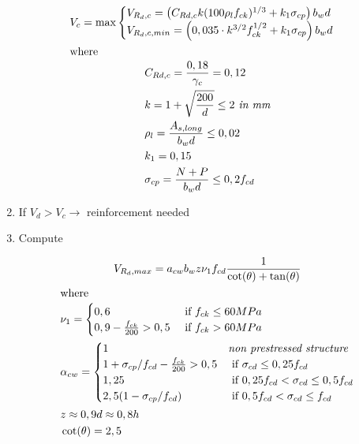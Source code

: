 \documentclass[landscape]{article}
\begin{document}
\begin{multicols*}{2}
\begin{enumerate}
    \begin{gather}\label{eq:2.1}
      V_c = \max
      \begin{cases}
        V_{R_d,c} = \left(C_{Rd,c}k(100\rho_l f_{ck})^{1/3}+k_1 \sigma_{cp}\right)b_wd\\
        V_{R_d,c,min}=\left(0,035 \cdot k^{3/2}f_{ck}^{1/2}+k_1 \sigma_{cp}\right)b_wd
      \end{cases}\\
      \shortintertext{where}
      \begin{aligned}
        &C_{Rd,c} = \frac{0,18}{\gamma_c} = 0,12 \\
        &k = 1 + \sqrt{\frac{200}{d}}\leq 2 \emph{ in mm} \\
        &\rho_l = \frac{A_{s,long}}{b_w d } \leq 0,02 \\
        &k_1 = 0,15\\
        &\sigma_{cp} = \frac{N+P}{b_w d}\leq 0,2 f_{cd}
      \end{aligned}\notag
    \end{gather}
    \item If $V_d>V_c \rightarrow$ reinforcement needed

  \item Compute 

    \begin{gather}\label{eq:1.2}
      V_{R_d,max} = a_{cw} b_w z \nu_1 f_{cd} \frac{1}{\cot(\theta) + \tan(\theta)}\\
      \shortintertext{where}
      \begin{aligned}
        &\nu_1 = 
          \begin{cases}
            0,6 &\text{ if } f_{ck} \leq 60 MPa\\
            0,9 - \frac{f_{ck}}{200}>0,5 & \text{ if } f_{ck} > 60 MPa
          \end{cases} \\
        &\alpha_{cw} = 
          \begin{cases}
            1 & \emph{non prestressed structure}\\
            1+ \sigma_{cp}/f_{cd} - \frac{f_{ck}}{200}>0,5 & \text{ if } \sigma_{cd} \leq 0,25 f_{cd} \\
            1,25 & \text{ if } 0,25f_{cd} <\sigma_{cd} \leq 0,5 f_{cd} \\
            2,5 (1- \sigma_{cp}/f_{cd}) & \text{ if } 0,5f_{cd} <\sigma_{cd} \leq f_{cd}
          \end{cases} \\
        & z \approx 0,9 d \approx 0,8 h \\
        & \cot(\theta) = 2,5
      \end{aligned}\notag
    \end{gather}


\end{enumerate}
\end{multicols*}
\end{document}
